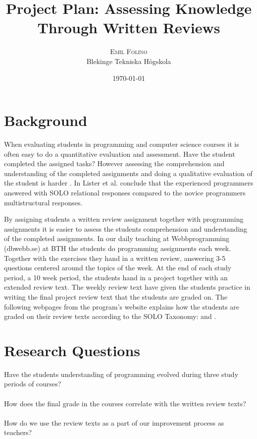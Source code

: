 \documentclass[twoside,twocolumn,a4paper,12pt,english]{article}
\title{Project Plan: Assessing Knowledge Through Written Reviews} %
\author{%
\textsc{Emil Folino}\\
\normalsize Blekinge Tekniska Högskola \\ %
}
\date{\today} %
\begin{document}
\maketitle


\section{Background}
When evaluating students in programming and computer science courses it is often easy to do a quantitative evaluation and assessment. Have the student completed the assigned tasks? However assessing the comprehension and understanding of the completed assignments and doing a qualitative evaluation of the student is harder \cite{biggs1982evaluation}. In \cite{lister2006not} Lister et al. conclude that the experienced programmers answered with SOLO relational responses compared to the novice programmers multistructural responses.

By assigning students a written review assignment together with programming assignments it is easier to assess the students comprehension and understanding of the completed assignments\cite{lister2006not}. In our daily teaching at Webbprogramming (dbwebb.se) at BTH the students do programming assignments each week. Together with the exercises they hand in a written review, answering 3-5 questions centered around the topics of the week. At the end of each study period, a 10 week period, the students hand in a project together with an extended review text. The weekly review text have given the students practice in writing the final project review text that the students are graded on. The following webpages from the program's website explains how the students are graded on their review texts according to the SOLO Taxonomy: \cite{redovisning} and \cite{solo}.




\section{Research Questions}

Have the students understanding of programming evolved during three study periods of courses? \\ \\
How does the final grade in the courses correlate with the written review texts?\\ \\
How do we use the review texts as a part of our improvement process as teachers?
\end{document}
